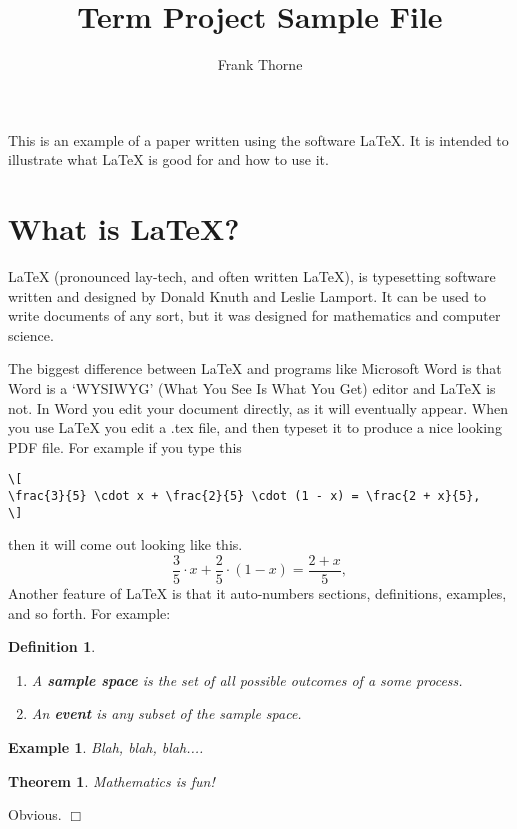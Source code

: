 \documentclass[12pt, leqno]{article}
\title{Term Project Sample File}
\author{Frank Thorne}
\newenvironment{proof}{\noindent {\bf Proof:}}{$\Box$ \vspace{2 ex}}
\newtheorem{theorem}[proposition]{Theorem}
\newtheorem{example}[proposition]{Example}
\newtheorem{definition}[proposition]{Definition}
\begin{document}
\maketitle



This is an example of a paper written using the software LaTeX. It is intended to illustrate what LaTeX is good for and how to use it.


\section{What is LaTeX?}

LaTeX (pronounced lay-tech, and often written \LaTeX), is typesetting software written and designed by Donald Knuth and Leslie
Lamport. It can be used to write documents of any sort, but it was designed for mathematics and computer science.

The biggest difference between LaTeX and programs like Microsoft Word is that Word is a `WYSIWYG' (What You See Is What You Get)
editor and LaTeX is not. In Word you edit your document directly, as it will eventually appear. When you use LaTeX you edit a .tex file,
and then typeset it to produce a nice looking PDF file. For example if you type this
\begin{verbatim}
\[
\frac{3}{5} \cdot x + \frac{2}{5} \cdot (1 - x) = \frac{2 + x}{5},
\]
\end{verbatim}
then it will come out looking like this.
\[
\frac{3}{5} \cdot x + \frac{2}{5} \cdot (1 - x) = \frac{2 + x}{5},
\]
Another feature of LaTeX is that it auto-numbers sections, definitions, examples, and so forth. For example:

\begin{definition}\label{foo}
\begin{enumerate}
\item
A {\bf sample space} is the set of all possible outcomes of a some process.
\item
An {\bf event} is any subset of the sample space.
\end{enumerate}
\end{definition}

\begin{example}\label{bar}
Blah, blah, blah....
\end{example}

\begin{theorem}\label{baz}
Mathematics is fun!
\end{theorem}
\begin{proof} Obvious. \end{proof}
\end{document}
